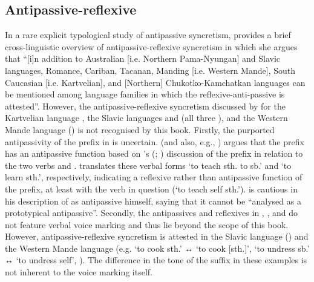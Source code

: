 \subsection{Antipassive-reflexive} \label{sec:simple-syncretism:antp-refl}
In a rare explicit typological study of antipassive syncretism, \citet[158]{janic:2010} provides a brief cross-linguistic overview of antipassive-reflexive syncretism in which she argues that “[i]n addition to Australian [i.e. Northern Pama-Nyungan] and Slavic languages, Romance, Ca\-ri\-ban, Tacanan, Manding [i.e. Western Mande], South Caucasian [i.e. Kartvelian], and [Northern] Chukotko-Kamchatkan languages can be mentioned among language families in which the re\-flex\-ive-anti-passive  is attested”. However, the antipassive-reflexive syncretism discussed by \citeauthor{janic:2010} for the Kartvelian language , the Slavic languages  and  (all three ), and the Western Mande language  () is not recognised by this book. Firstly, the purported antipassivity of the prefix  in  is uncertain. \citeauthor{janic:2010} (and also, e.g., \citealt[193]{sanso:2017}) argues that the prefix has an antipassive function based on \citeauthor{lacroix:2009}’s (\citeyear[467]{lacroix:2009}; \citeyear[181f.]{lacroix:2012}) discussion of the prefix in relation to the two verbs  and . \citeauthor{lacroix:2009} translates these verbal forms ‘to teach sth. to sb.’ and ‘to learn sth.’, respectively, indicating a reflexive rather than antipassive function of the prefix, at least with the verb in question (‘to teach self sth.’). \citet[181]{lacroix:2012} is cautious in his description of  as antipassive himself, saying that it cannot be “analysed as a prototypical antipassive”. Secondly, the antipassives and reflexives in , , and  do not feature verbal voice marking and thus lie beyond the scope of this book. However, antipassive-reflexive syncretism is attested in the Slavic language  () and the Western Mande language  (e.g.  ‘to cook sth.’ ↔  ‘to cook [sth.]’,  ‘to undress sb.’ ↔  ‘to undress self’, \citealt[10]{creissels:2012}). The difference in the tone of the suffix  in these examples is not inherent to the voice marking itself. 

